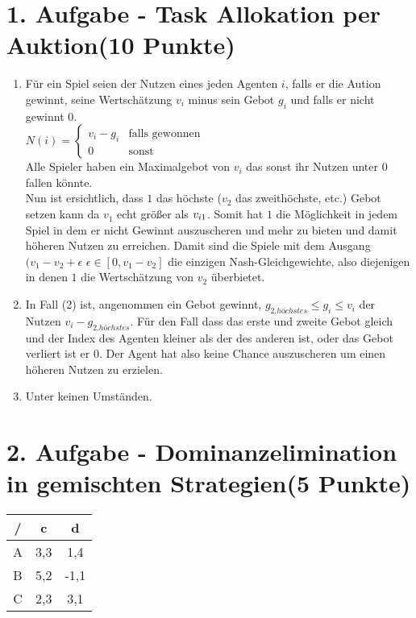 \documentclass[a4paper, 11pt]{article}
\newcommand{\RM}[1]{\MakeUppercase{\romannumeral #1}}
\begin{document}
\section*{1. Aufgabe - Task Allokation per Auktion\hfill {\small (10 Punkte)}}
\begin{enumerate}
\item 
Für ein Spiel seien der Nutzen eines jeden Agenten $i$, falls er die Aution gewinnt, seine Wertschätzung $v_i$ minus sein Gebot $g_i$ und falls er nicht gewinnt 0.\\
$N(i) = \begin{cases}v_i - g_i&\text{falls gewonnen}\\0&\text{sonst}\end{cases} $ \\
Alle Spieler haben ein Maximalgebot von $v_i$ das sonst ihr Nutzen unter $0$ fallen könnte.\\
Nun ist ersichtlich, dass $1$ das höchste ($v_2$ das zweithöchste, etc.) Gebot setzen kann da $v_1$ echt größer als $v_{i\\1}$. Somit hat $1$ die Möglichkeit in jedem Spiel in dem er nicht Gewinnt auszuscheren und mehr zu bieten und damit höheren Nutzen zu erreichen.
Damit sind die Spiele mit dem Ausgang $(v_1 - v_2 + \epsilon$ $\epsilon \in [0,v_1-v_2]$ die einzigen Nash-Gleichgewichte, also diejenigen in denen $1$ die Wertschätzung von $v_2$ überbietet.

\item 
In Fall (2) ist, angenommen ein Gebot gewinnt, $g_{2.höchstes} \leq g_i \leq v_i$ der Nutzen $v_i - g_{2.höchstes}$. Für den Fall dass das erste und zweite Gebot gleich und der Index des Agenten kleiner als der des anderen ist, oder das Gebot verliert ist er 0. Der Agent hat also keine Chance auszuscheren um einen höheren Nutzen zu erzielen.
\item 
Unter keinen Umständen.
\end{enumerate}
\section*{2. Aufgabe - Dominanzelimination in gemischten Strategien\hfill {\small (5 Punkte)}}

\begin{center}
\begin{tabular}{c | cc}
	\RM{1}/\RM{2} & c & d \\ \hline
	A & 3,3 & 1,4\\
	B & 5,2 & -1,1\\
	C & 2,3 & 3,1\\
\end{tabular}
\end{center}
\end{document}
